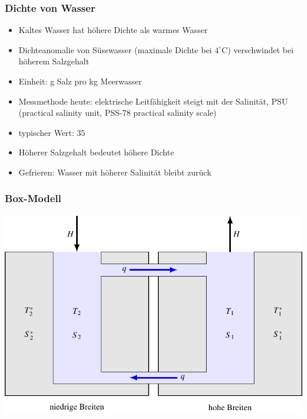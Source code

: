 \begin{frame}
\frametitle{Dichte von Wasser}
\begin{temperatur}
\begin{itemize}
\item
Kaltes Wasser hat höhere Dichte als warmes Wasser 
\item
Dichteanomalie von Süsswasser (maximale Dichte bei $4^\circ\text{C}$)
verschwindet bei höherem Salzgehalt
\end{itemize}
\end{temperatur}

\begin{salinity}
\begin{itemize}
\item Einheit: g Salz pro kg Meerwasser
\item Messmethode heute: elektrische Leitfähigkeit steigt mit der Salinität,
PSU (practical salinity unit, PSS-78 practical salinity scale)
\item typischer Wert: $35$
\item Höherer Salzgehalt bedeutet höhere Dichte
\item Gefrieren: Wasser mit höherer Salinität bleibt zurück
\end{itemize}
\end{salinity}

\end{frame}

\begin{frame}
\frametitle{Box-Modell}
\begin{center}
\includegraphics[width=0.8\hsize]{../../skript/chapters/4/boxmodell.pdf}
\end{center}
\end{frame}



